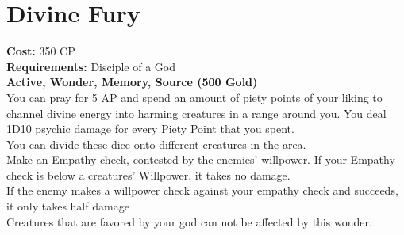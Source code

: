 \section{Divine Fury}\label{wonder:divineFury}
\textbf{Cost:} 350 CP\\
\textbf{Requirements:} Disciple of a God\\
\textbf{Active, Wonder, Memory, Source (500 Gold)}\\
You can pray for 5 AP and spend an amount of piety points of your liking to channel divine energy into harming creatures in a  range around you.
You deal 1D10 psychic damage for every Piety Point that you spent.\\
You can divide these dice onto different creatures in the area.\\
Make an Empathy check, contested by the enemies' willpower.
If your Empathy check is below a creatures' Willpower, it takes no damage.\\
If the enemy makes a willpower check against your empathy check and succeeds, it only takes half damage\\
Creatures that are favored by your god can not be affected by this wonder.\\
\\